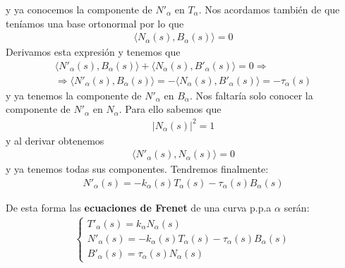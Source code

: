 y ya conocemos la componente de $N'_\alpha$ en $T_\alpha$. Nos acordamos también de que teníamos una base ortonormal por lo que
\begin{gather*}
    \langle N_\alpha(s), B_\alpha(s) \rangle = 0
\end{gather*}
Derivamos esta expresión y tenemos que 
\begin{gather*}
    \langle N'_\alpha (s), B_\alpha(s) \rangle + \langle N_\alpha(s), B'_\alpha(s) \rangle = 0 \Rightarrow \\
    \Rightarrow \langle N'_\alpha (s), B_\alpha(s) \rangle = -\langle N_\alpha(s), B'_\alpha(s) \rangle = -\tau_\alpha(s)
\end{gather*}
y ya tenemos la componente de $N'_\alpha$ en $B_\alpha$. Nos faltaría solo conocer la componente de $N'_\alpha$ en $N_\alpha$. Para ello sabemos que 
\begin{gather*}
    |N_\alpha(s)|^2 = 1
\end{gather*}
y al derivar obtenemos 
\begin{gather*}
    \langle N'_\alpha(s), N_\alpha(s) \rangle = 0
\end{gather*}
y ya tenemos todas sus componentes. Tendremos finalmente:
\begin{gather*}
    N'_\alpha(s) = -k_\alpha(s) T_\alpha(s) - \tau_\alpha(s) B_\alpha(s)
\end{gather*}

De esta forma las \textbf{ecuaciones de Frenet} de una curva p.p.a $\alpha$ serán:
\begin{gather*}
    \left\{
        \begin{array}{l}
            T'_\alpha(s) = k_\alpha N_\alpha(s)\\
            N'_\alpha(s) = -k_\alpha(s) T_\alpha(s) - \tau_\alpha(s) B_\alpha(s)\\
            B'_\alpha(s) = \tau_\alpha(s) N_\alpha(s)
        \end{array}
    \right.
\end{gather*}

